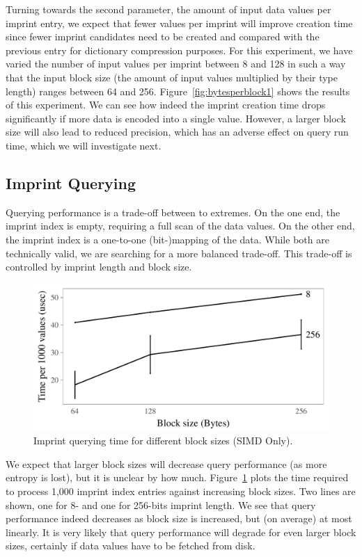 \documentclass[sigconf]{acmart}
\begin{document}
Turning towards the second parameter, the amount of input data values per imprint entry, we expect that fewer values per imprint will improve
creation time since fewer imprint candidates need to be created and compared with the previous entry for dictionary compression purposes. For
this experiment, we have varied the number of input values per imprint between 8 and 128 in such a way that the input block size (the amount of input values multiplied by their type length) ranges between 64 and 256. Figure~\ref{fig:bytesperblock1} shows the results of this experiment. We can see how indeed the imprint creation time drops significantly if more data is encoded into a single value. However, a larger block size will
also lead to reduced precision, which has an adverse effect on query run time, which we will investigate next.

\subsection{Imprint Querying}

Querying performance is a trade-off between to extremes. On the one end, the imprint index is empty, requiring a full scan of the data values.
On  the other end, the imprint index is a one-to-one (bit-)mapping of the data. While both are technically valid, we are searching for a more
balanced  trade-off. This trade-off is controlled by imprint length and block size. 

\begin{figure}[t]
\begin{center}
\includegraphics[width=\columnwidth,trim=0mm 0mm 0mm 0mm,clip]{qblocksize1.pdf}
\end{center}
\caption{Imprint querying time for different block sizes (SIMD Only).\label{fig:qblocksize1}}
\end{figure}

We expect that larger block sizes will decrease query performance (as more entropy is lost), but it is unclear by how much.
Figure~\ref{fig:qblocksize1} plots the time required to process 1,000 imprint index entries against increasing block sizes.
Two lines are shown, one for 8- and one for 256-bits imprint length. We see that query performance indeed decreases as block
size is increased, but (on average) at most linearly. It is very likely that query performance will degrade for even larger
block sizes, certainly if data values have to be fetched from disk.
\end{document}
